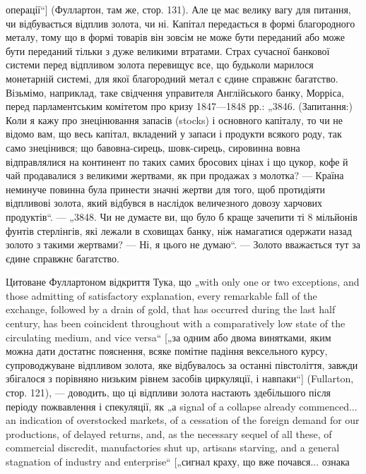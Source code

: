операції“] (Фуллартон, там же, стор. 131). Але це має велику
вагу для питання, чи відбувається відплив золота, чи ні. Капітал
передається в формі благородного металу, тому що в формі
товарів він зовсім не може бути переданий або може бути
переданий тільки з дуже великими втратами. Страх сучасної
банкової системи перед відпливом золота перевищує все, що
будьколи марилося монетарній системі, для якої благородний
метал є єдине справжнє багатство. Візьмімо, наприклад, таке
свідчення управителя Англійського банку, Морріса, перед парламентським
комітетом про кризу 1847—1848 рр.: „3846. (Запитання:)
Коли я кажу про знецінювання запасів (stocks) і основного
капіталу, то чи не відомо вам, що весь капітал, вкладений у запаси
і продукти всякого роду, так само знецінився; що бавовна-сирець,
шовк-сирець, сировинна вовна відправлялися на континент
по таких самих бросових цінах і що цукор, кофе й чай продавалися
з великими жертвами, як при продажах з молотка? — Країна
неминуче повинна була принести значні жертви для того, щоб
протидіяти відпливові золота, який відбувся в наслідок величезного
довозу харчових продуктів“. — „3848. Чи не думаєте
ви, що було б краще зачепити ті 8 мільйонів фунтів стерлінгів, які
лежали в сховищах банку, ніж намагатися одержати назад золото
з такими жертвами? — Ні, я цього не думаю“. — Золото вважається
тут за єдине справжнє багатство.

Цитоване Фуллартоном відкриття Тука, що „with only one
or two exceptions, and those admitting of satisfactory explanation,
every remarkable fall of the exchange, followed by a drain of gold,
that has occurred during the last half century, has been coincident
throughout with a comparatively low state of the circulating medium,
and vice versa“ [„за одним або двома винятками, яким
можна дати достатнє пояснення, всяке помітне падіння вексельного
курсу, супроводжуване відпливом золота, яке відбувалось
за останні півстоліття, завжди збігалося з порівняно низьким
рівнем засобів циркуляції, і навпаки“] (Fullarton, стор. 121), —
доводить, що ці відпливи золота настають здебільшого після періоду
пожвавлення і спекуляції, як „а signal of a collapse already
commenced... an indication of overstocked markets, of a cessation
of the foreign demand for our productions, of delayed returns, and,
as the necessary sequel of all these, of commercial discredit, manufactories
shut up, artisans starving, and a general stagnation of
industry and enterprise“ [„сигнал краху, що вже почався... ознака
\parbreak{}  %
